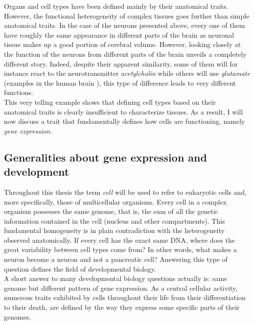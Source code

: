      
    Organs and cell types have been defined mainly by their anatomical traits. However, the functional heterogeneity of complex tissues goes further than simple anatomical traits. In the case of the neurons presented above, every one of them have roughly the same appearance in different parts of the brain as neuronal tissue makes up a good portion of cerebral volume. However, looking closely at the function of the neurons from different parts of the brain unveils a completely different story. Indeed, despite their apparent similarity, some of them will for instance react to the neurotransmitter \emph{acetylcholin} while others will use \emph{glutamate} (examples in the human brain \cite{hefti86,van93}), this type of difference leads to very different functions.\\
     
     This very telling example shows that defining cell types based on their anatomical traits is clearly insufficient to characterize tissues.  As a result, I will now discuss a trait that fundamentally defines how cells are functioning, namely \emph{gene expression}. 

\subsection{Generalities about gene expression and development}\label{sec:gene_expression_background}     
       
     Throughout this thesis the term \emph{cell} will be used to refer to eukaryotic cells and, more specifically, those of multicellular organisms. Every cell in a complex organism possesses the same genome, that is, the sum of all the genetic information contained in the cell (nucleus and other compartments). This fundamental homogeneity is in plain contradiction with the heterogeneity observed anatomically. If every cell has the exact same DNA, where does the great variability between cell types come from? In other words, what makes a neuron become a neuron and not a pancreatic cell? Answering this type of question defines the field of developmental biology.\\
     
     A short answer to many developmental biology questions actually is: same genome but different pattern of gene expression. As a central cellular activity, numerous traits exhibited by cells throughout their life from their differentiation to their death, are defined by the way they express some specific parts of their genomes.\\

